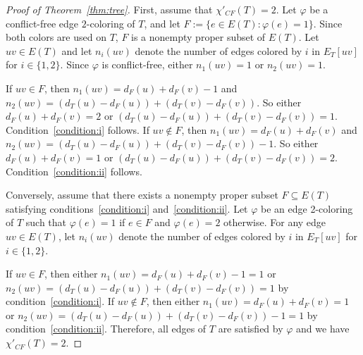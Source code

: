 \documentclass[11pt]{article}
\theoremstyle{plain}
\numberwithin{equation}{section}
\begin{document}
\begin{proof}[Proof of Theorem~\ref{thm:tree}]
First, assume that $\chi'_{CF}(T)=2$. Let $\varphi$
be a conflict-free edge $2$-coloring of $T$, and let $F:=\{e\in E(T)\colon \varphi(e)=1\}$.
Since both colors are used on $T$, $F$ is a nonempty proper subset of $E(T)$.
Let $uv\in E(T)$ and let $n_i(uv)$ denote the number of edges colored by $i$ in $E_T[uv]$ for $i\in\{1,2\}$.
Since $\varphi$ is conflict-free, either $n_1(uv)=1$ or $n_2(uv)=1$.

If $uv\in F$, then $n_1(uv)=d_F(u)+d_F(v)-1$ and $n_2(uv)=(d_T(u)-d_F(u))+(d_T(v)-d_F(v))$. So either $d_F(u)+d_F(v)=2$ or $(d_T(u)-d_F(u))+(d_T(v)-d_F(v))=1$. Condition~\ref{condition:i} follows.
If $uv\notin F$, then $n_1(uv)=d_F(u)+d_F(v)$ and $n_2(uv)=(d_T(u)-d_F(u))+(d_T(v)-d_F(v))-1$. So either $d_F(u)+d_F(v)=1$ or $(d_T(u)-d_F(u))+(d_T(v)-d_F(v))=2$. Condition~\ref{condition:ii} follows.


Conversely, assume that there exists a nonempty proper subset $F\subseteq E(T)$ satisfying conditions~\ref{condition:i} and~\ref{condition:ii}. Let $\varphi$ be an edge 2-coloring of $T$ such that $\varphi(e)=1$ if $e\in F$ and $\varphi(e)=2$ otherwise.
For any edge $uv\in E(T)$, let $n_i(uv)$ denote the number of edges colored by $i$ in $E_T[uv]$ for $i\in\{1,2\}$.

If $uv\in F$, then either $n_1(uv)=d_F(u)+d_F(v)-1=1$ or $n_2(uv)=(d_T(u)-d_F(u))+(d_T(v)-d_F(v))=1$ by condition~\ref{condition:i}.
If $uv\notin F$, then  either $n_1(uv)=d_F(u)+d_F(v)=1$ or $n_2(uv)=(d_T(u)-d_F(u))+(d_T(v)-d_F(v))-1=1$ by condition~\ref{condition:ii}.
Therefore, all edges of $T$ are satisfied by $\varphi$ and we have $\chi'_{CF}(T)=2$.
\end{proof}





\end{document}
